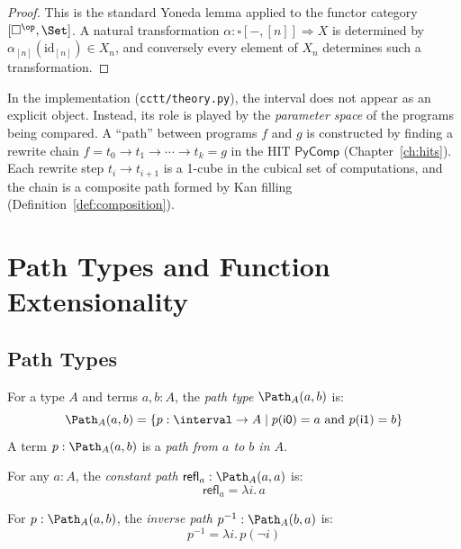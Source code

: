 \begin{proof}
This is the standard Yoneda lemma applied to the functor category
$[\square^{\op}, \Set]$.  A natural transformation
$\alpha : \square[-, [n]] \Rightarrow X$ is determined by
$\alpha_{[n]}(\mathrm{id}_{[n]}) \in X_n$, and conversely every element
of $X_n$ determines such a transformation.
\end{proof}

\begin{remark}
In the implementation (\texttt{cctt/theory.py}), the interval does not appear
as an explicit object.  Instead, its role is played by the \emph{parameter space}
of the programs being compared.  A ``path'' between programs $f$ and $g$ is
constructed by finding a rewrite chain $f = t_0 \to t_1 \to \cdots \to t_k = g$
in the HIT $\mathsf{PyComp}$ (Chapter~\ref{ch:hits}).  Each rewrite step $t_i \to t_{i+1}$
is a 1-cube in the cubical set of computations, and the chain is a composite
path formed by Kan filling (Definition~\ref{def:composition}).
\end{remark}


\chapter{Path Types and Function Extensionality}
\label{ch:paths}

\section{Path Types}

\begin{definition}
For a type $A$ and terms $a, b : A$, the \emph{path type}
$\Path_A(a, b)$ is:
\[
  \Path_A(a, b) = \{p : \interval \to A \mid p(\mathsf{i0}) = a
    \text{ and } p(\mathsf{i1}) = b\}
\]
A term $p : \Path_A(a, b)$ is a \emph{path from $a$ to $b$ in $A$}.
\end{definition}

\begin{definition}[Reflexivity]
For any $a : A$, the \emph{constant path} $\mathsf{refl}_a :
\Path_A(a, a)$ is:
\[
  \mathsf{refl}_a = \lambda i.\, a
\]
\end{definition}

\begin{definition}[Symmetry]
For $p : \Path_A(a, b)$, the \emph{inverse path} $p^{-1} :
\Path_A(b, a)$ is:
\[
  p^{-1} = \lambda i.\, p(\lnot i)
\]
\end{definition}

